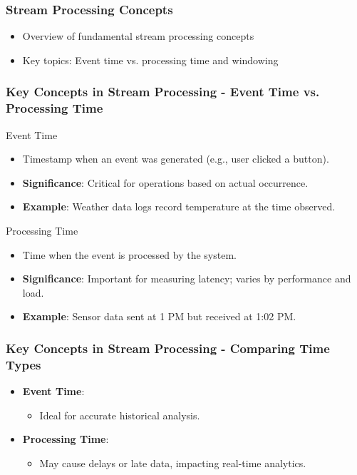\documentclass[aspectratio=169]{beamer}
\begin{document}
\begin{frame}[fragile]
    \frametitle{Stream Processing Concepts}
    \begin{itemize}
        \item Overview of fundamental stream processing concepts
        \item Key topics: Event time vs. processing time and windowing
    \end{itemize}
\end{frame}

\begin{frame}[fragile]
    \frametitle{Key Concepts in Stream Processing - Event Time vs. Processing Time}
    \begin{block}{Event Time}
        \begin{itemize}
            \item Timestamp when an event was generated (e.g., user clicked a button).
            \item \textbf{Significance}: Critical for operations based on actual occurrence.
            \item \textbf{Example}: Weather data logs record temperature at the time observed.
        \end{itemize}
    \end{block}
    
    \begin{block}{Processing Time}
        \begin{itemize}
            \item Time when the event is processed by the system.
            \item \textbf{Significance}: Important for measuring latency; varies by performance and load.
            \item \textbf{Example}: Sensor data sent at 1 PM but received at 1:02 PM.
        \end{itemize}
    \end{block}
\end{frame}

\begin{frame}[fragile]
    \frametitle{Key Concepts in Stream Processing - Comparing Time Types}
    \begin{itemize}
        \item \textbf{Event Time}:
            \begin{itemize}
                \item Ideal for accurate historical analysis.
            \end{itemize}
        \item \textbf{Processing Time}:
            \begin{itemize}
                \item May cause delays or late data, impacting real-time analytics.
            \end{itemize}
    \end{itemize}
\end{frame}
\end{document}
